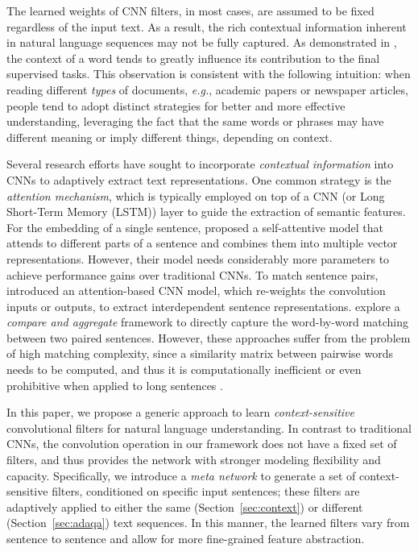 \documentclass[11pt,a4paper]{article}
\begin{document}
The learned weights of CNN filters, in most cases, are assumed to be fixed regardless of the input text. As a result, the rich contextual information inherent in natural language sequences may not be fully captured. As demonstrated in \citet{cohen1999context},  the context of a word tends to greatly influence its contribution to the final supervised tasks.
This observation is consistent with the following intuition: when reading different {\em types} of documents, \emph{e.g.}, academic papers or newspaper articles, people tend to adopt distinct strategies for better and more effective understanding, leveraging the fact that the same words or phrases may have different meaning or imply different things, depending on context. 


Several research efforts have sought to incorporate \emph{contextual information} into CNNs to adaptively extract text representations. One common strategy is the \emph{attention mechanism}, which is typically employed on top of a CNN (or Long Short-Term Memory (LSTM)) layer to guide the extraction of semantic features. For the embedding of a single sentence, \citet{lin2017structured} proposed a self-attentive model that attends to different parts of a sentence and combines them into multiple vector representations. However, their model needs considerably more parameters to achieve performance gains over traditional CNNs.
To match sentence pairs, \citet{yin2015abcnn} introduced an attention-based CNN model, which re-weights the convolution inputs or outputs, to extract interdependent sentence representations.
\citet{wang2016sentence, wang2016compare} explore a \emph{compare and aggregate} framework to directly capture the word-by-word matching between two paired sentences. However, these approaches suffer from the problem of high matching complexity, since a similarity matrix between pairwise words needs to be computed, and thus it is computationally inefficient or even prohibitive when applied to long sentences \citep{mou2015natural}.

In this paper, we propose a generic approach to learn \emph{context-sensitive} convolutional filters for natural language understanding. In contrast to traditional CNNs, the convolution operation in our framework does not have a fixed set of filters, and thus provides the network with stronger modeling flexibility and capacity. Specifically, we introduce a \emph{meta network} to generate a set of context-sensitive filters, conditioned on specific input sentences; these filters are adaptively applied to either the same (Section~\ref{sec:context}) or different (Section~\ref{sec:adaqa}) text sequences. In this manner, the learned filters vary from sentence to sentence and allow for more fine-grained feature abstraction. 
\end{document}
